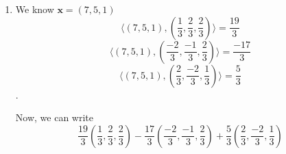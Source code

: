 \documentclass[12pt]{article}
\begin{document}
\begin{enumerate}[leftmargin=0em]
\begin{enumerate}[leftmargin=!]
    \item
    We know $\mathbf{x} = (7, 5, 1)$
    \[ \langle (7, 5, 1), (\frac{1}{3}, \frac{2}{3}, \frac{2}{3}) \rangle = \frac{19}{3}\]
    \[ \langle (7, 5, 1), (\frac{-2}{3}, \frac{-1}{3}, \frac{2}{3}) \rangle = \frac{-17}{3}\]
    \[ \langle (7, 5, 1), (\frac{2}{3}, \frac{-2}{3}, \frac{1}{3}) \rangle = \frac{5}{3}\].

    Now, we can write 
    \[ \frac{19}{3}(\frac{1}{3}, \frac{2}{3}, \frac{2}{3}) - \frac{17}{3}(\frac{-2}{3}, \frac{-1}{3}, \frac{2}{3}) + \frac{5}{3}(\frac{2}{3}, \frac{-2}{3}, \frac{1}{3})\]
  \end{enumerate}
\end{enumerate}
\end{document}
